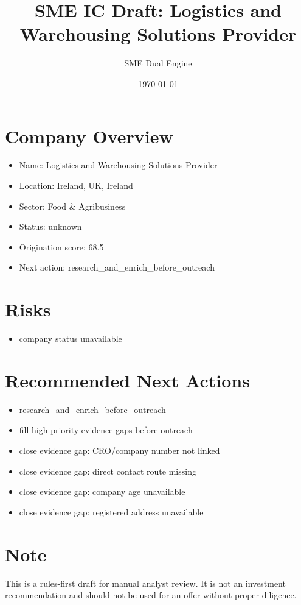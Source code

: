 \documentclass[11pt,a4paper]{article}
\title{SME IC Draft: Logistics and Warehousing Solutions Provider}
\author{SME Dual Engine}
\date{\today}
\begin{document}
\maketitle
\section*{Company Overview}
\begin{itemize}[leftmargin=1.4em]
\item Name: Logistics and Warehousing Solutions Provider
\item Location: Ireland, UK, Ireland
\item Sector: Food \& Agribusiness
\item Status: unknown
\item Origination score: 68.5
\item Next action: research\_and\_enrich\_before\_outreach
\end{itemize}
\section*{Risks}
\begin{itemize}[leftmargin=1.4em]
\item company status unavailable
\end{itemize}
\section*{Recommended Next Actions}
\begin{itemize}[leftmargin=1.4em]
\item research\_and\_enrich\_before\_outreach
\item fill high-priority evidence gaps before outreach
\item close evidence gap: CRO/company number not linked
\item close evidence gap: direct contact route missing
\item close evidence gap: company age unavailable
\item close evidence gap: registered address unavailable
\end{itemize}
\section*{Note}
This is a rules-first draft for manual analyst review. It is not an investment
recommendation and should not be used for an offer without proper diligence.
\end{document}
